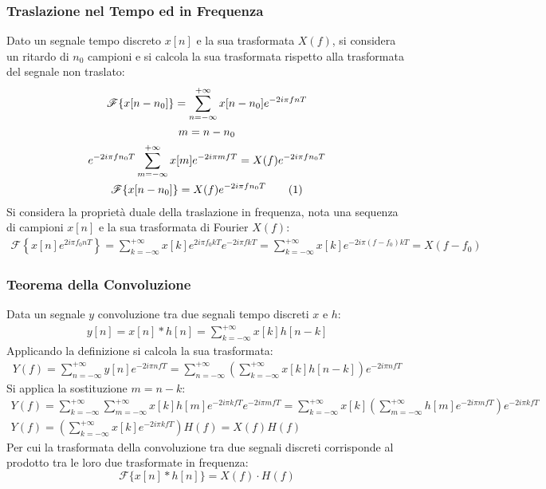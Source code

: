 \documentclass{article}
\newcommand{\tageq}{\tag{\stepcounter{equation}\theequation}}
\numberwithin{equation}{subsection}
\begin{document}
\subsubsection{Traslazione nel Tempo ed in Frequenza}

Dato un segnale tempo discreto $x[n]$ e la sua trasformata $X(f)$, si considera un ritardo di $n_0$ campioni e si calcola la sua trasformata rispetto alla trasformata del 
segnale non traslato:
\begin{gather*}
    \mathscr{F}\{x[n-n_0]\}=\displaystyle\sum_{n=-\infty}^{+\infty}x[n-n_0]e^{-2i\pi fnT}\\
    m=n-n_0\\
    e^{-2i\pi fn_0T}\sum_{m=-\infty}^{+\infty}x[m]e^{-2i\pi mfT}=X(f)e^{-2i\pi fn_0T}\\
    \mathscr{F}\{x[n-n_0]\}=X(f)e^{-2i\pi fn_0T}\tageq
\end{gather*}
Si considera la proprietà duale della traslazione in frequenza, nota una sequenza di campioni $x[n]$ e la sua trasformata di Fourier $X(f)$:
\begin{gather}
    \mathscr{F}\left\{x[n]e^{2i\pi f_0nT}\right\}=\displaystyle\sum_{k=-\infty}^{+\infty}x[k]e^{2i\pi f_0kT}e^{-2i\pi fkT}=\sum_{k=-\infty}^{+\infty}x[k]e^{-2i\pi (f-f_0)kT}=X(f-f_0)
\end{gather} 

\subsubsection{Teorema della Convoluzione}

Data un segnale $y$ convoluzione tra due segnali tempo discreti $x$ e $h$:
\begin{gather*}
    y[n]=x[n]*h[n]=\displaystyle\sum_{k=-\infty}^{+\infty}x[k]h[n-k]
\end{gather*}
Applicando la definizione si calcola la sua trasformata:
\begin{gather*}
    Y(f)=\displaystyle\sum_{n=-\infty}^{+\infty}y[n]e^{-2i\pi nfT}=\displaystyle\sum_{n=-\infty}^{+\infty}\left(\sum_{k=-\infty}^{+\infty}x[k]h[n-k]\right)e^{-2i\pi nfT}
\end{gather*}
Si applica la sostituzione $m=n-k$:
\begin{gather*}
    Y(f)=\displaystyle\sum_{k=-\infty}^{+\infty}\sum_{m=-\infty}^{+\infty}x[k]h[m]e^{-2i\pi kfT}e^{-2i\pi mfT}=\sum_{k=-\infty}^{+\infty}x[k]\left(\sum_{m=-\infty}^{+\infty}h[m]e^{-2i\pi mfT}\right)e^{-2i\pi kfT}\\
    Y(f)=\displaystyle\left(\sum_{k=-\infty}^{+\infty}x[k]e^{-2i\pi kfT}\right)H(f)=X(f)H(f)
\end{gather*}
Per cui la trasformata della convoluzione tra due segnali discreti corrisponde al prodotto tra le loro due trasformate in frequenza:
\begin{equation}
    \mathscr{F}\{x[n]*h[n]\}=X(f)\cdot H(f)
\end{equation}
\end{document}
